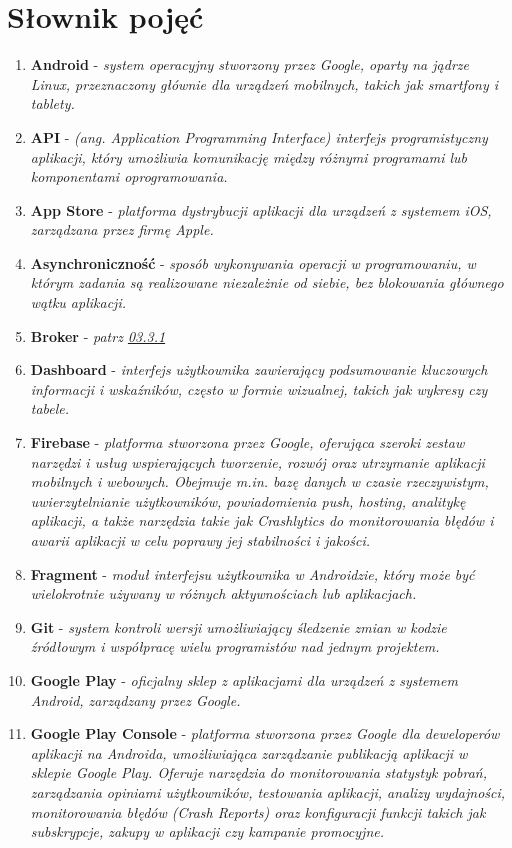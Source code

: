 \section{Słownik pojęć}
\begin{enumerate}[leftmargin=*]
\item \textbf{Android} - \textit{system operacyjny stworzony przez Google, oparty na jądrze Linux, przeznaczony głównie dla urządzeń mobilnych, takich jak smartfony i tablety.}
\item \textbf{API} - \textit{(ang. Application Programming Interface) interfejs programistyczny aplikacji, który umożliwia komunikację między różnymi programami lub komponentami oprogramowania.}
\item \textbf{App Store} - \textit{platforma dystrybucji aplikacji dla urządzeń z systemem iOS, zarządzana przez firmę Apple.}
\item \textbf{Asynchroniczność} - \textit{sposób wykonywania operacji w programowaniu, w którym zadania są realizowane niezależnie od siebie, bez blokowania głównego wątku aplikacji.}
\item \textbf{Broker} - \textit{patrz \hyperlink{03.3.1}{03.3.1}}
\item \textbf{Dashboard} - \textit{interfejs użytkownika zawierający podsumowanie kluczowych informacji i wskaźników, często w formie wizualnej, takich jak wykresy czy tabele.}
\item \textbf{Firebase} - \textit{platforma stworzona przez Google, oferująca szeroki zestaw narzędzi i usług wspierających tworzenie, rozwój oraz utrzymanie aplikacji mobilnych i webowych. Obejmuje m.in. bazę danych w czasie rzeczywistym, uwierzytelnianie użytkowników, powiadomienia push, hosting, analitykę aplikacji, a także narzędzia takie jak Crashlytics do monitorowania błędów i awarii aplikacji w celu poprawy jej stabilności i jakości.}
\item \textbf{Fragment} - \textit{moduł interfejsu użytkownika w Androidzie, który może być wielokrotnie używany w różnych aktywnościach lub aplikacjach.}
\item \textbf{Git} - \textit{system kontroli wersji umożliwiający śledzenie zmian w kodzie źródłowym i współpracę wielu programistów nad jednym projektem.}
\item \textbf{Google Play} - \textit{oficjalny sklep z aplikacjami dla urządzeń z systemem Android, zarządzany przez Google.}
\item \textbf{Google Play Console} - \textit{platforma stworzona przez Google dla deweloperów aplikacji na Androida, umożliwiająca zarządzanie publikacją aplikacji w sklepie Google Play. Oferuje narzędzia do monitorowania statystyk pobrań, zarządzania opiniami użytkowników, testowania aplikacji, analizy wydajności, monitorowania błędów (Crash Reports) oraz konfiguracji funkcji takich jak subskrypcje, zakupy w aplikacji czy kampanie promocyjne.}

\end{enumerate}
